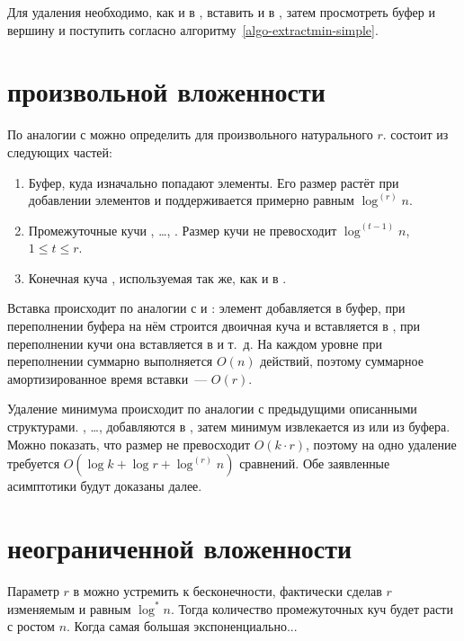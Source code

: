 Для удаления необходимо, как и в \SCH, вставить \MH[1] и \MH[2] в \HH,
затем просмотреть буфер и вершину \HH и поступить согласно
алгоритму~\ref{algo-extractmin-simple}.


\section{\CH произвольной вложенности}
По аналогии с \CH[2] можно определить \CH[r] для произвольного натурального $r$.  
\CH[r] состоит из следующих частей:

\begin{enumerate}
\item Буфер, куда изначально попадают элементы. Его размер растёт при добавлении
    элементов и поддерживается примерно равным $\log^{(r)} n$.
\item Промежуточные кучи \MH[1], \dots, \MH[r]. Размер кучи \MH[t] не превосходит
    $\log^{(t-1)} n$, $1 \leq t \leq r$.
\item Конечная куча \HH, используемая так же, как и в \SCH.
\end{enumerate}

Вставка происходит по аналогии с \SCH и \CH[2]: элемент добавляется в буфер,
при переполнении буфера на нём строится двоичная куча и вставляется в \MH[r],
при переполнении кучи \MH[r] она вставляется в \MH[r-1] и т.~д.
На каждом уровне при переполнении суммарно выполняется $O(n)$ действий,
поэтому суммарное амортизированное время вставки~--- $O(r)$.

Удаление минимума происходит по аналогии с предыдущими описанными структурами.
\MH[1], \dots, \MH[r] добавляются в \HH, затем минимум извлекается из \HH
или из буфера. Можно показать, что размер \HH не превосходит
$O(k \cdot r)$, поэтому на одно удаление требуется $O(\log k + \log r + \log^{(r)} n)$
сравнений. Обе заявленные асимптотики будут доказаны далее.

\section{\CH неограниченной вложенности}

Параметр $r$ в \CH[*] можно устремить к бесконечности, фактически сделав
$r$ изменяемым и равным $\log^* n$. Тогда количество промежуточных куч
будет расти с ростом $n$. Когда самая большая \MH экспоненциально...

